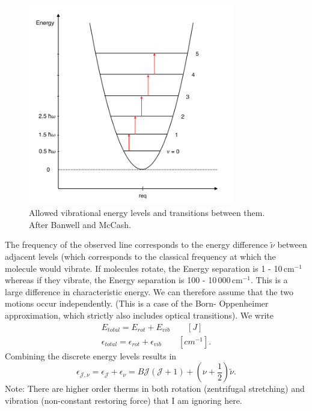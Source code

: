 \begin{figure}[htbp]
\begin{center}
\includegraphics[width=0.8\textwidth]{figures/Vibration_parabol_2}
\caption{Allowed vibrational energy levels and transitions between them. After Banwell and McCash.}
\label{Vibration_parabol_2}
\end{center}
\end{figure}

The frequency of the observed line corresponds to the energy
difference $\tilde{\nu}$ between adjacent levels (which corresponds to
the classical frequency at which the molecule would vibrate. If
molecules rotate, the Energy separation is 1 - 10\,cm$^{-1}$ whereas
if they vibrate, the Energy separation is 100 -
10\,000\,cm$^{-1}$. This is a large difference in characteristic
energy. We can therefore assume that the two motions occur
independently.  (This is a case of the Born- Oppenheimer
approximation, which strictly also includes optical transitions). We
write
 \begin{gather}
E_{total} = E_{rot} + E_{vib} \qquad \left[J\right]  \\
\epsilon_{total} = \epsilon_{rot} + \epsilon_{vib} \qquad \left[cm^{-1}\right].
 \end{gather}
Combining the discrete energy levels results in
\begin{equation}
\epsilon_{\mathcal{J},\nu} = \epsilon_{\mathcal{J}} + \epsilon_{\nu} = B \mathcal{J} (\mathcal{J} + 1) + (\nu + \frac{1}{2})\tilde{\nu}.
\end{equation}
Note: There are higher order therms in both rotation (zentrifugal stretching) and vibration (non-constant restoring force) that I am ignoring here. \par
 
